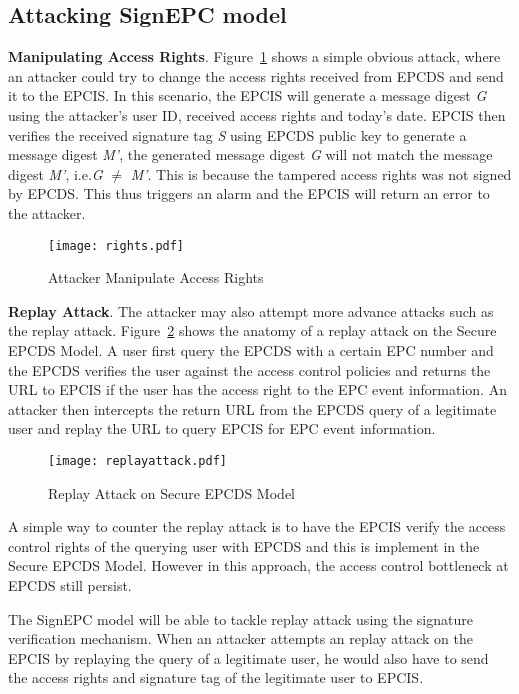 \documentclass[conference]{IEEEtran}
\begin{document}
\subsection {Attacking SignEPC model}
\textbf{Manipulating Access Rights}. Figure~\ref{fig:rights} shows a simple obvious attack, where an attacker could try to change the access rights received from EPCDS and send it to the EPCIS. In this scenario, the EPCIS will generate a message digest \emph{G} using the attacker's user ID, received access rights and today's date. EPCIS then verifies the received signature tag \emph{S} using EPCDS public key to generate a message digest \emph{M'}, the generated message digest \emph{G} will not match the message digest \emph{M'}, i.e.\emph{G} $\neq$ \emph{M'}. This is because the tampered access rights was not signed by EPCDS. This thus triggers an alarm and the EPCIS will return an error to the attacker. 

\begin{figure}[h]
\begin{center}
\texttt{[image: rights.pdf]}
\caption{Attacker Manipulate Access Rights \label{fig:rights}}
\end{center}
\end{figure}

\textbf{Replay Attack}. The attacker may also attempt more advance attacks such as the replay attack. Figure~\ref{fig:replay} shows the anatomy of a replay attack on the Secure EPCDS Model. A user first query the EPCDS with a certain EPC number and the EPCDS verifies the user against the access control policies and returns the URL to EPCIS if the user has the access right to the EPC event information. An attacker then intercepts the return URL from the EPCDS query of a legitimate user and replay the URL to query EPCIS for EPC event information.  

\begin{figure}[h]
\begin{center}
\texttt{[image: replayattack.pdf]}
\caption{Replay Attack on Secure EPCDS Model\label{fig:replay}}
\end{center}
\end{figure}

A simple way to counter the replay attack is to have the EPCIS verify the access control rights of the querying user with EPCDS and this is implement in the Secure EPCDS Model. However in this approach, the access control bottleneck at EPCDS still persist.

The SignEPC model will be able to tackle replay attack using the signature verification mechanism. When an attacker attempts an replay attack on the EPCIS by replaying the query of a legitimate user, he would also have to send the access rights and signature tag of the legitimate user to EPCIS. 
\end{document}
